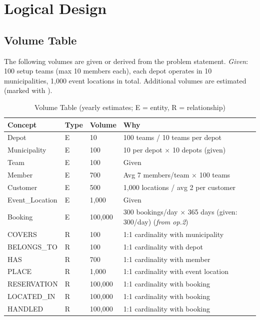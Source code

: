 \documentclass[12pt]{article}
\begin{document}
\newpage
\section{Logical Design}

\subsection{Volume Table}

The following volumes are given or derived from the problem statement.
\textit{Given}: 100 setup teams (max 10 members each), each depot operates in 10 municipalities,
1{,}000 event locations in total.
Additional volumes are estimated (marked with \dag).

\begin{table}[H]
  \scriptsize
  \renewcommand{\arraystretch}{1.3}
  \begin{tabularx}{\textwidth}{|X|X|X|X|}
  \hline
  \textbf{Concept} & \textbf{Type} & \textbf{Volume} & \textbf{Why} \\ \hline
  Depot           & E & 10         & 100 teams / 10 teams per depot \\ \hline
  Municipality    & E & 100        & 10 per depot $\times$ 10 depots (given) \\ \hline
  Team            & E & 100        & Given \\ \hline
  Member          & E & 700        & Avg 7 members/team $\times$ 100 teams \\ \hline
  Customer        & E & 500        & 1{,}000 locations / avg 2 per customer \\ \hline
  Event\_Location & E & 1{,}000    & Given \\ \hline
  Booking         & E & 100{,}000  & 300 bookings/day $\times$ 365 days (given: 300/day) (\textit{from op.2}) \\ \hline
  COVERS          & R & 100        & 1:1 cardinality with municipality \\ \hline
  BELONGS\_TO     & R & 100        & 1:1 cardinality with depot \\ \hline
  HAS             & R & 700        & 1:1 cardinality with member \\ \hline
  PLACE           & R & 1{,}000    & 1:1 cardinality with event location \\ \hline
  RESERVATION     & R & 100{,}000  & 1:1 cardinality with booking \\ \hline
  LOCATED\_IN      & R & 100{,}000  & 1:1 cardinality with booking \\ \hline
  HANDLED         & R & 100{,}000  & 1:1 cardinality with booking \\ \hline
  \end{tabularx}
  \caption{Volume Table (yearly estimates; E = entity, R = relationship)}
\end{table}
\end{document}
